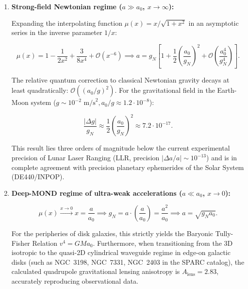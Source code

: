 \documentclass[11pt,a4paper]{article}
\theoremstyle{definition}
\begin{document}
\begin{enumerate}
\item \textbf{Strong-field Newtonian regime ($a \gg a_0$, $x \to \infty$):}

Expanding the interpolating function $\mu(x) = x/\sqrt{1+x^2}$ in an asymptotic series in the inverse parameter $1/x$:

\begin{equation}\label{eq:4.12}\tag{4.12}
\mu(x) = 1 - \frac{1}{2x^2} + \frac{3}{8x^4} + \mathcal{O}(x^{-6}) \implies a = g_N \left[ 1 + \frac{1}{2}\left( \frac{a_0}{g_N} \right)^2 + \mathcal{O}\left( \frac{a_0^4}{g_N^4} \right) \right].
\end{equation}

The relative quantum correction to classical Newtonian gravity decays at least quadratically: $\mathcal{O}((a_0/g)^2)$. For the gravitational field in the Earth-Moon system ($g \sim 10^{-2}\text{ m/s}^2, a_0/g \approx 1.2 \cdot 10^{-8}$):

\begin{equation}\label{eq:4.12a}\tag{4.12a}
\frac{|\Delta g|}{g_N} \approx \frac{1}{2} \left( \frac{a_0}{g_N} \right)^2 \approx 7.2 \cdot 10^{-17}.
\end{equation}

This result lies three orders of magnitude below the current experimental precision of Lunar Laser Ranging (LLR, precision $|\Delta a/a| \sim 10^{-13}$) and is in complete agreement with precision planetary ephemerides of the Solar System (DE440/INPOP).

\item \textbf{Deep-MOND regime of ultra-weak accelerations ($a \ll a_0$, $x \to 0$):}

\begin{equation}\label{eq:4.13}\tag{4.13}
\mu(x) \xrightarrow{x \to 0} x = \frac{a}{a_0} \implies g_N = a \cdot \left(\frac{a}{a_0}\right) = \frac{a^2}{a_0} \implies a = \sqrt{g_N a_0}.
\end{equation}

For the peripheries of disk galaxies, this strictly yields the Baryonic Tully-Fisher Relation $v^4 = G M a_0$. Furthermore, when transitioning from the 3D isotropic to the quasi-2D cylindrical waveguide regime in edge-on galactic disks (such as NGC~3198, NGC~7331, NGC~2403 in the SPARC catalog), the calculated quadrupole gravitational lensing anisotropy is $A_{\text{lens}} = 2.83$, accurately reproducing observational data.
\end{enumerate}
\end{document}
